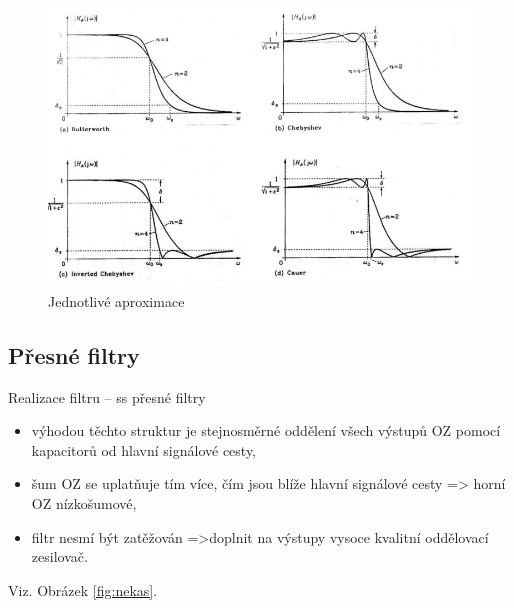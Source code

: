    \begin{figure}[h]
   \begin{center}
     \includegraphics[scale=0.8]{images/Aprox.png}
   \end{center}
   \caption{Jednotlivé aproximace}
   \label{fig:sig}
  \end{figure}
\newpage 
\subsection{Přesné filtry}    
  Realizace filtru – ss přesné filtry
\begin{itemize}
\item výhodou těchto struktur je stejnosměrné oddělení všech
výstupů OZ pomocí kapacitorů od hlavní signálové cesty,
\item šum OZ se uplatňuje tím více, čím jsou blíže hlavní signálové
cesty => horní OZ nízkošumové,
\item filtr nesmí být zatěžován =>doplnit na výstupy vysoce kvalitní
oddělovací zesilovač.
\end{itemize}
Viz. Obrázek \ref{fig:nekas}.






